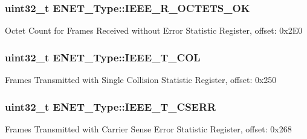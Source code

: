 \subsubsection[{\texorpdfstring{I\+E\+E\+E\+\_\+\+R\+\_\+\+O\+C\+T\+E\+T\+S\+\_\+\+OK}{IEEE_R_OCTETS_OK}}]{ uint32\+\_\+t E\+N\+E\+T\+\_\+\+Type\+::\+I\+E\+E\+E\+\_\+\+R\+\_\+\+O\+C\+T\+E\+T\+S\+\_\+\+OK}\hypertarget{structENET__Type_a00ba779131d741b1b78d4ddbea1349a3}{}\label{structENET__Type_a00ba779131d741b1b78d4ddbea1349a3}
Octet Count for Frames Received without Error Statistic Register, offset\+: 0x2\+E0 
\subsubsection[{\texorpdfstring{I\+E\+E\+E\+\_\+\+T\+\_\+1\+C\+OL}{IEEE_T_1COL}}]{ uint32\+\_\+t E\+N\+E\+T\+\_\+\+Type\+::\+I\+E\+E\+E\+\_\+\+T\+\_\+C\+OL}\hypertarget{structENET__Type_aac3cf634699556b77727deaab37dfb45}{}\label{structENET__Type_aac3cf634699556b77727deaab37dfb45}
Frames Transmitted with Single Collision Statistic Register, offset\+: 0x250 
\subsubsection[{\texorpdfstring{I\+E\+E\+E\+\_\+\+T\+\_\+\+C\+S\+E\+RR}{IEEE_T_CSERR}}]{ uint32\+\_\+t E\+N\+E\+T\+\_\+\+Type\+::\+I\+E\+E\+E\+\_\+\+T\+\_\+\+C\+S\+E\+RR}\hypertarget{structENET__Type_a75c410cfc59a8336a78d98e59130d9d1}{}\label{structENET__Type_a75c410cfc59a8336a78d98e59130d9d1}
Frames Transmitted with Carrier Sense Error Statistic Register, offset\+: 0x268 
